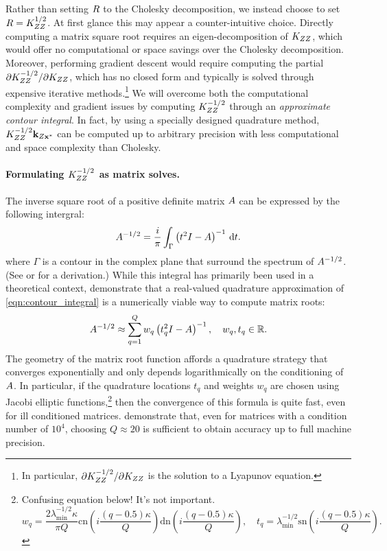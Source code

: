 Rather than setting $R$ to the Cholesky decomposition, we instead choose to set $R = K_{ZZ}^{1/2}$.
At first glance this may appear a counter-intuitive choice.
Directly computing a matrix square root requires an eigen-decomposition of $K_{ZZ}$, which would offer no computational or space savings over the Cholesky decomposition.
Moreover, performing gradient descent would require computing the partial $\partial K_{ZZ}^{-1/2} / \partial K_{ZZ}$, which has no closed form  and typically is solved through expensive iterative methods.\footnote{
  In particular, $\partial K_{ZZ}^{-1/2} / \partial K_{ZZ}$ is the solution to a Lyapunov equation.
}
We will overcome both the computational complexity and gradient issues by computing $K_{ZZ}^{-1/2}$ through an \emph{approximate contour integral}.
In fact, by using a specially designed quadrature method, $K_{ZZ}^{-1/2} \mathbf{k}_{Z\mathbf{x}^*}$ can be computed up to arbitrary precision with less computational and space complexity than Cholesky.

\paragraph{Formulating $K_{ZZ}^{-1/2}$ as matrix solves.}
The inverse square root of a positive definite matrix $A$ can be expressed by the following intergral:
%
\begin{equation}
	A^{-1/2} = \frac{i}{\pi} \int_\Gamma \left( t^2 I - A \right)^{-1} \,\mathrm{d}{t}.
	\label{eqn:contour_integral}
\end{equation}
%
where $\Gamma$ is a contour in the complex plane that surround the spectrum of $A^{-1/2}$.
(See \cite{hale2008computing} or \citep[][Ch. 6]{higham2008functions} for a derivation.)
While this integral has primarily been used in a theoretical context, \citet{hale2008computing} demonstrate that a real-valued quadrature approximation of \cref{eqn:contour_integral} is a numerically viable way to compute matrix roots:
%
\begin{equation}
	A^{-1/2} \approx \sum_{q=1}^Q w_q \left( t_q^2 I - A \right)^{-1}, \quad w_q, t_q \in \mathbb{R}.
	\label{eqn:contour_integral_quad}
\end{equation}
%
The geometry of the matrix root function affords a quadrature strategy that converges exponentially and only depends logarithmically on the conditioning of $A$.
In particular, if the quadrature locations $t_q$ and weights $w_q$ are chosen using Jacobi elliptic functions,\footnote{
  Confusing equation below! It's not important.
  \[
    w_q = \frac{ 2 \lambda_\text{min}^{-1/2} \kappa }{ \pi Q } \text{cn}\left( i\frac{(q - 0.5)\kappa}{Q} \right)  \text{dn} \left( i\frac{(q - 0.5)\kappa}{Q} \right), \quad t_q = \lambda_\text{min}^{-1/2} \text{sn} \left( i\frac{(q - 0.5)\kappa}{Q} \right).
  \]
}
then the convergence of this formula is quite fast, even for ill conditioned matrices.
\citet{hale2008computing} demonstrate that, even for matrices with a condition number of $10^4$, choosing $Q \approx 20$ is sufficient to obtain accuracy up to full machine precision.


